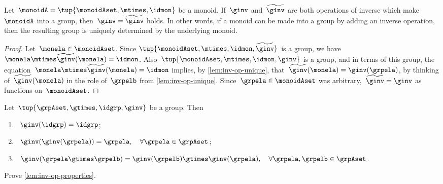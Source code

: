 \begin{corollary}
 \label{cor:inv-op-unique}
Let~$\monoidA = \tup{\monoidAset, \mtimes,  \idmon }$ be a monoid.
 If~$\ginv$ and~$\widetilde \ginv$ are both operations of inverse which make~$\monoidA$ into a group, then~$\ginv = \widetilde \ginv$ holds.
 In other words, if a monoid can be made into a group by adding an inverse operation, then the resulting group is uniquely determined by the underlying monoid.
\end{corollary}

\begin{proof}
Let~$\monela \in \monoidAset$.
Since $\tup{\monoidAset, \mtimes,  \idmon, \widetilde \ginv }$ is a group, we have~$\monela \mtimes  \widetilde \ginv(\monela) = \idmon$.
Also~$\tup{\monoidAset, \mtimes,  \idmon, \ginv }$ is a group, and in terms of this group, the equation~$\monela \mtimes  \widetilde \ginv(\monela) = \idmon$ implies, by \cref{lem:inv-op-unique}, that~$\widetilde \ginv(\monela) = \ginv(\grpela)$, by thinking of~$\widetilde \ginv(\monela)$ in the role of~$\grpelb$ from \cref{lem:inv-op-unique}.
Since~$\grpela \in \monoidAset$ was arbitrary,~$\widetilde \ginv = \ginv$ as functions on~$\monoidAset$.
\end{proof}


\begin{lemma}
  \label{lem:inv-op-properties}
  Let~$\tup{\grpAset, \gtimes, \idgrp, \ginv}$ be a group. Then
  \begin{enumerate}
    \item\label{eq:group-neutral-invariant}~$\ginv(\idgrp) = \idgrp$;
    \item\label{eq:group-inverse-inverse}~$ \ginv(\ginv(\grpela)) = \grpela, \quad \forall \grpela \in \grpAset$;
    \item\label{eq:group-inverse-of-composition}~$\ginv(\grpela \gtimes \grpelb ) = \ginv(\grpelb) \gtimes \ginv(\grpela), \quad \forall \grpela, \grpelb \in \grpAset$.
  \end{enumerate}
\end{lemma}

\begin{gradedexercise}\label{ex:GroupInverseProperties}
  Prove \cref{lem:inv-op-properties}.
\end{gradedexercise}

